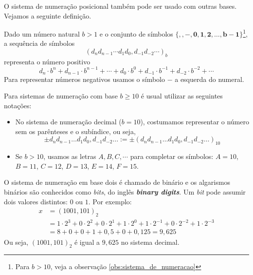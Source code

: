 O sistema de numeração posicional também pode ser usado com outras bases. Vejamos a seguinte definição.

\begin{defn}\label{def:sistema_de_numeracao}
Dado um número natural $b>1$ e o conjunto de símbolos $\{\pmb{,}, \pmb{-},  \pmb{0}, \pmb{1}, \pmb{2},\dotsc, \pmb{b-1}\}$\footnote{Para $b>10$, veja a observação \ref{obs:sistema_de_numeracao}}, a sequência de símbolos
\begin{equation*}
  \left(d_nd_{n-1} \cdots d_1d_0,d_{-1}d_{-2} \cdots \right)_b  
\end{equation*}
representa o número positivo
\begin{equation*}
  d_n\cdot b^n + d_{n-1}\cdot b^{n-1} + \cdots + d_0\cdot b^0 + d_{-1}\cdot b^{-1}+d_{-2}\cdot b^{-2} + \cdots
\end{equation*}
Para representar números negativos usamos o símbolo $-$ a esquerda do numeral.
\end{defn}

\begin{obs}[$b\geq 10$]\label{obs:sistema_de_numeracao}
Para sistemas de numeração com base $b \geq 10$ é usual utilizar as seguintes notações:
\begin{itemize}
\item No sistema de numeração decimal ($b=10$), costumamos representar o número sem os parênteses e o subíndice, ou seja,
\begin{equation*}
  \pm d_nd_{n-1}\ldots d_1d_0,d_{-1}d_{-2}\ldots := \pm (d_nd_{n-1}\ldots d_1d_0,d_{-1}d_{-2}\ldots)_{10}  
\end{equation*}
\item Se $b>10$, usamos as letras $A, B, C, \cdots$ para completar os símbolos: $A=10$, $B=11$, $C=12$, $D=13$, $E=14$, $F=15$.
\end{itemize}
\end{obs}


\begin{ex} O sistema de numeração em base dois é chamado de binário e os algarismos binários são conhecidos como \textit{bits}, do inglês \textit{\bf{b}inary dig\bf{its}}. Um \textit{bit} pode assumir dois valores distintos: $0$ ou $1$. Por exemplo:
\begin{equation*}
  \begin{split}
    x &= (1001,101)_{2} \\
    &= 1\cdot 2^3 +0\cdot 2^2 +0\cdot 2^1 +1\cdot 2^0  +1\cdot 2^{-1} +0\cdot 2^{-2} +1\cdot 2^{-3} \\
    &= 8+0+0+1+ 0,5+0+0,125 = 9,625    
  \end{split}
\end{equation*}
Ou seja, $(1001,101)_{2}$ é igual a $9,625$ no sistema decimal.
\end{ex}


